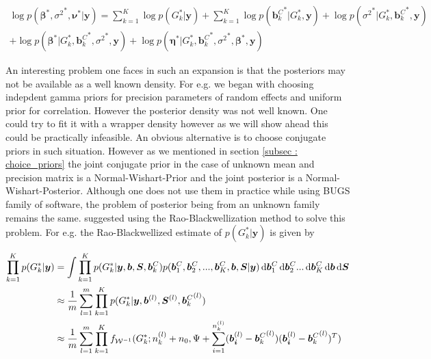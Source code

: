 \begin{multline}
\log{p({\boldsymbol{\beta}}^*, {\sigma^2}^*, \boldsymbol{\nu}^*|\boldsymbol{y})} = 
\sum_{k=1}^K{\log{p(G_k^*|\boldsymbol{y})}} + 
\sum_{k=1}^K{\log{p({\boldsymbol{b}_k^C}^*|G_k^*, \boldsymbol{y})}} + 
\log{p({\sigma^2}^*|G_k^*, {\boldsymbol{b}_k^C}^*, \boldsymbol{y})}\\
+ \log{p({\boldsymbol{\beta}}^*|G_k^*, {\boldsymbol{b}_k^C}^*, {\sigma^2}^*, \boldsymbol{y})} + 
\log{p({\boldsymbol{\eta}}^*|G_k^*, {\boldsymbol{b}_k^C}^*, {\sigma^2}^*,{\boldsymbol{\beta}}^*, \boldsymbol{y})}
\end{multline}

An interesting problem one faces in such an expansion is that the posteriors may not be available as a well known density. For e.g. we began with choosing indepdent gamma priors for precision parameters of random effects and uniform prior for correlation. However the posterior density was not well known. One could try to fit it with a wrapper density however as we will show ahead this could be practically infeasible. An obvious alternative is to choose conjugate priors in such situation. However as we mentioned in section \ref{subsec : choice_priors} the joint conjugate prior in the case of unknown mean and precision matrix is a Normal-Wishart-Prior and the joint posterior is a Normal-Wishart-Posterior. Although one does not use them in practice while using BUGS family of software, the problem of posterior being from an unknown family remains the same. \citet{chib_marginal_1995} suggested using the Rao-Blackwellization method to solve this problem. For e.g. the Rao-Blackwellized estimate of $p(G_k^*|\boldsymbol{y})$ is given by

\begin{equation}
\label{eq : rao_blackwellization_wishart}
\begin{split}
\prod_{k=1}^K p(G_k^*|\boldsymbol{y}) & = \int \prod_{k=1}^{K} p(G_k^*| \boldsymbol{y}, \boldsymbol{b}, \boldsymbol{S}, \boldsymbol{b}_k^C) p(\boldsymbol{b}_1^C, \boldsymbol{b}_2^C,..., \boldsymbol{b}_K^C,\boldsymbol{b}, \boldsymbol{S}|\boldsymbol{y}) 
\mathop{}\!\mathrm{d}{\boldsymbol{b}_1^C} \mathop{}\!\mathrm{d}{\boldsymbol{b}_2^C} ... \mathop{}\!\mathrm{d}{\boldsymbol{b}_K^C} \mathop{}\!\mathrm{d}{\boldsymbol{b}} \mathop{}\!\mathrm{d}{\boldsymbol{S}}\\
& \approx \frac 1 m \sum_{l=1}^m \prod_{k=1}^{K} p(G_k^*| \boldsymbol{y}, \boldsymbol{b}^{(l)}, \boldsymbol{S}^{(l)}, {\boldsymbol{b}_k^C}^{(l)
})\\
& \approx \frac 1 m \sum_{l=1}^m \prod_{k=1}^{K} f_{\mathcal{W}^{-1}}(G_k^*; n_k^{(l)}+n_0, \Psi + \sum_{i=1}^{n_k^{(l)}}(\boldsymbol{b_i}^{(l)} - {\boldsymbol{b}_k^C}^{(l)})(\boldsymbol{b_i}^{(l)} - {\boldsymbol{b}_k^C}^{(l)})^T)
\end{split}
\end{equation}

